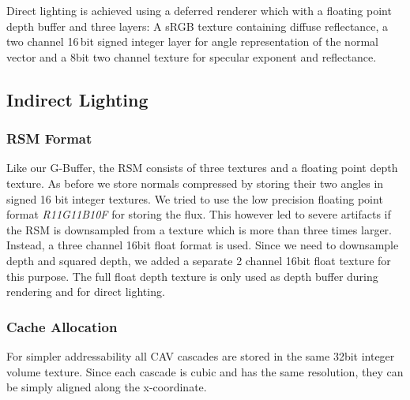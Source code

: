 \documentclass[thesis.tex]{subfiles}
\begin{document}
Direct lighting is achieved using a deferred renderer which with a floating point depth buffer and three layers:
A sRGB texture containing diffuse reflectance, a two channel 16\,bit signed integer layer for angle representation of the normal vector and a 8bit two channel texture for specular exponent and reflectance.

\subsection{Indirect Lighting}

\subsubsection{RSM Format}
Like our G-Buffer, the RSM consists of three textures and a floating point depth texture.
As before we store normals compressed by storing their two angles in signed 16 bit integer textures.
We tried to use the low precision floating point format \emph{R11G11B10F} for storing the flux.
This however led to severe artifacts if the RSM is downsampled from a texture which is more than three times larger.
Instead, a three channel 16bit float format is used.
Since we need to downsample depth and squared depth, we added a separate 2 channel 16bit float texture for this purpose.
The full float depth texture is only used as depth buffer during rendering and for direct lighting.

\subsubsection{Cache Allocation} \label{sec:impl:cachealloc}
For simpler addressability all CAV cascades are stored in the same 32bit integer volume texture.
Since each cascade is cubic and has the same resolution, they can be simply aligned along the x-coordinate.
\end{document}
